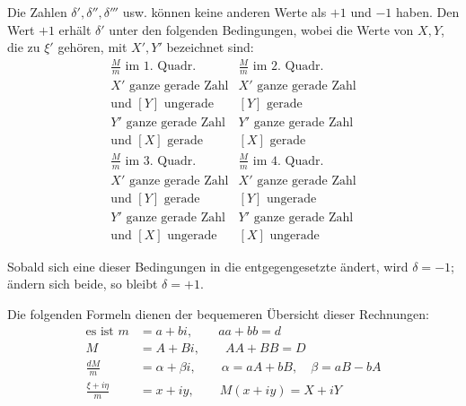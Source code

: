 Die Zahlen $\delta',\delta'',\delta'''$ usw. können keine anderen Werte als $+1$ und $-1$ haben. Den Wert $+1$ erhält $\delta'$ unter den folgenden Bedingungen, wobei die Werte von $X,Y$, die zu $\xi'$ gehören, mit $X',Y'$ bezeichnet sind:
\[
\begin{array}{l|l}
\frac{M}{m}\text{ im 1. Quadr.}&\frac{M}{m}\text{ im 2. Quadr.}\\
X'\text{ ganze gerade Zahl}&X'\text{ ganze gerade Zahl}\\
\text{und }[Y]\text{ ungerade}&[Y]\text{ gerade}\\\hline
Y'\text{ ganze gerade Zahl}&Y'\text{ ganze gerade Zahl}\\
\text{und }[X]\text{ gerade}&[X]\text{ gerade}
\end{array}
\]
\[
\begin{array}{l|l}
\frac{M}{m}\text{ im 3. Quadr.}&\frac{M}{m}\text{ im 4. Quadr.}\\
X'\text{ ganze gerade Zahl}&X'\text{ ganze gerade Zahl}\\
\text{und }[Y]\text{ gerade}&[Y]\text{ ungerade}\\\hline
Y'\text{ ganze gerade Zahl}&Y'\text{ ganze gerade Zahl}\\
\text{und }[X]\text{ ungerade}&[X]\text{ ungerade}
\end{array}
\]

Sobald sich eine dieser Bedingungen in die entgegengesetzte ändert, wird $\delta=-1$; ändern sich beide, so bleibt $\delta=+1$.

Die folgenden Formeln dienen der bequemeren Übersicht dieser Rechnungen:
\[
\begin{aligned}
\text{es ist }m&=a+bi,\qquad aa+bb=d\\
M&=A+Bi,\qquad AA+BB=D\\
\frac{dM}{m}&=\alpha+\beta i,\qquad\alpha=aA+bB,\quad\beta=aB-bA\\
\frac{\xi+i\eta}{m}&=x+iy,\qquad M(x+iy)=X+iY
\end{aligned}
\]

